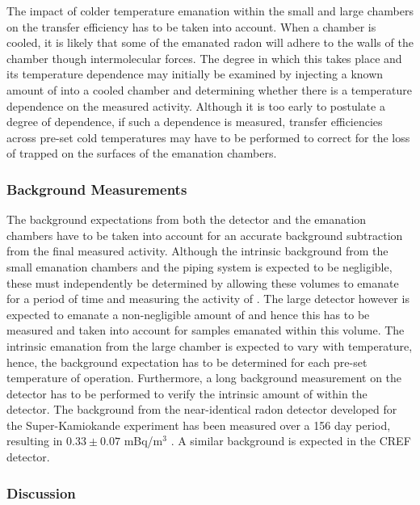 The impact of colder temperature emanation within the small and large chambers on the transfer efficiency has to be taken into account. When a chamber is cooled, it is likely that some of the emanated radon will adhere to the walls of the chamber though intermolecular forces. The degree in which this takes place and its temperature dependence may initially be examined by injecting a known amount of \RnTTT{} into a cooled chamber and determining whether there is a temperature dependence on the measured activity. Although it is too early to postulate a degree of dependence, if such a dependence is measured, transfer efficiencies across pre-set cold temperatures may have to be performed to correct for the loss of \RnTTT{} trapped on the surfaces of the emanation chambers. 


\subsubsection{Background Measurements}

The background expectations from both the detector and the emanation chambers have to be taken into account for an accurate background subtraction from the final measured activity. Although the intrinsic \RnTTT{} background from the small emanation chambers and the piping system is expected to be negligible, these must independently be determined by allowing these volumes to emanate for a period of time and measuring the activity of \RnTTT{}. The large detector however is expected to emanate a non-negligible amount of \RnTTT{} and hence this has to be measured and taken into account for samples emanated within this volume. The intrinsic emanation from the large chamber is expected to vary with temperature, hence, the background expectation has to be determined for each pre-set temperature of operation. Furthermore, a long background measurement on the detector has to be performed to verify the intrinsic amount of \RnTTT{} within the detector. The background from the near-identical radon detector developed for the Super-Kamiokande experiment has been measured over a 156 day period, resulting in $0.33 \pm 0.07$ mBq/m$^{3}$ \cite{Nakano:2017rsy}. A similar background is expected in the CREF detector.


\subsubsection{Discussion}

